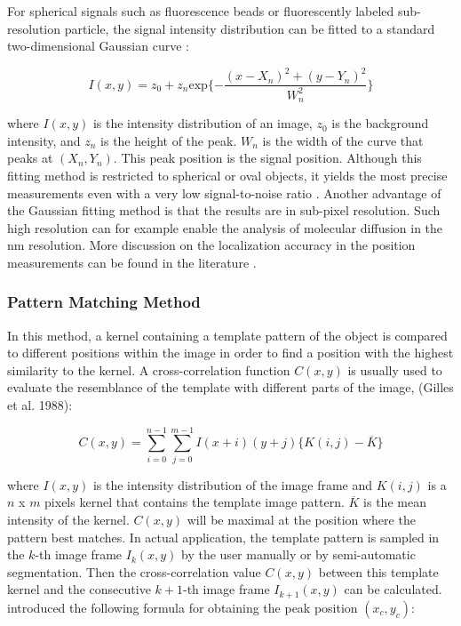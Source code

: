 For spherical signals such as fluorescence beads or fluorescently
labeled sub-resolution particle, the signal intensity distribution can
be fitted to a standard two-dimensional Gaussian curve \citep{cmaderson1992, schuetzBJ1997, TardinEJ_2003.pdf}: 

\begin{equation}
I(x,y)=z_{0}+z_{n}\text{exp}\{-\frac{(x-X_{n})^{2}+(y-Y_{n})^{2}}{W_{n}^{2}} \}
\end{equation}

where $I(x, y)$ is the intensity distribution of an image,
$z_0$ is the background intensity, and
$z_n$ is the height of the peak.
$W_n$ is the width of the curve that
peaks at $(X_n, Y_n)$. This peak position is the signal
position. Although this fitting method is restricted to spherical or
oval objects, it yields the most precise measurements even with a very
low signal-to-noise ratio \citep{cheezumBJ2001}. Another advantage of
the Gaussian fitting method is that the results are in sub-pixel
resolution. Such high resolution can for example enable the analysis of
molecular diffusion in the nm resolution. More discussion on the
localization accuracy in the position measurements can be found in the
literature \citep{oberBJ2004, martinBJ2002, ThompsonBJ2002.pdf}.

\subsubsection{Pattern Matching Method}

In this method, a kernel containing a template pattern of the object is
compared to different positions within the image in order to find a
position with the highest similarity to the kernel. A cross-correlation
function $C(x,y)$ is usually used to evaluate the resemblance of
the template with different parts of the image, (Gilles et al. 1988):

\begin{equation}
\label{eq:simplecorrelation}
C(x,y)=\sum_{i=0}^{n-1}\sum_{j=0}^{m-1}I(x+i)(y+j)\{K(i,j)-\overline{K}\}
\end{equation}


where $I(x,y)$ is the intensity distribution of the image frame
and $K(i,j)$ is a $n$ x $m$ pixels kernel that
contains the template image pattern. 
$\overline{K}$
is the mean intensity of the kernel. $C(x,y)$ will be maximal at
the position where the pattern best matches. In actual application, the
template pattern is sampled in the $k$-th image frame
$I_{k}(x,y)$ by the user manually
or by semi-automatic segmentation. Then the cross-correlation value
$C(x, y)$ between this template kernel and the consecutive
$k+1$-th image frame
$I_{k+1}(x,y)$ can be calculated.
\citet{gellesNAT1988} introduced the following formula for
obtaining the peak position $(x_{c}, y_{c})$:

